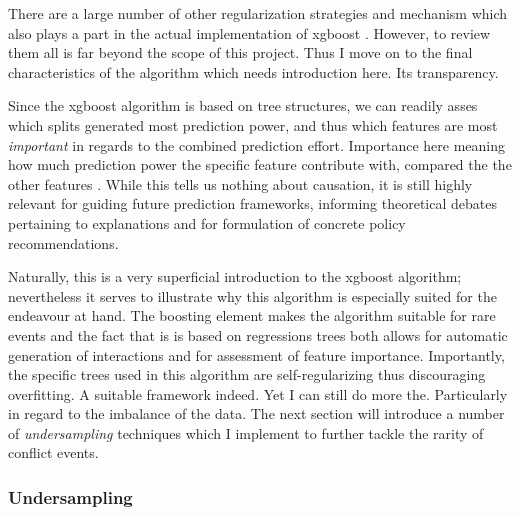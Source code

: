 \documentclass[a4paper]{article}
\begin{document}
There are a large number of other regularization strategies and mechanism which also plays a part in the actual implementation of xgboost \citep[787]{Chen_2016}. However, to review them all is far beyond the scope of this project. Thus I move on to the final characteristics of the algorithm which needs introduction here. Its transparency.\par

Since the xgboost algorithm is based on tree structures, we can readily asses which splits generated most prediction power, and thus which features are most \emph{important} in regards to the combined prediction effort. Importance here meaning how much prediction power the specific feature contribute with, compared the the other features \citep[787-788]{Chen_2016}. While this tells us nothing about causation, it is still highly relevant for guiding future prediction frameworks, informing theoretical debates pertaining to explanations and for formulation of concrete policy recommendations.\par

Naturally, this is a very superficial introduction to the xgboost algorithm; nevertheless it serves to illustrate why this algorithm is especially suited for the endeavour at hand. The boosting element makes the algorithm suitable for rare events and the fact that is is based on regressions trees both allows for automatic generation of interactions and for assessment of feature importance. Importantly, the specific trees used in this algorithm are self-regularizing thus discouraging overfitting. A suitable framework indeed. Yet I can still do more the. Particularly in regard to the imbalance of the data. The next section will introduce a number of \emph{undersampling} techniques which I implement to further tackle the rarity of conflict events.\par 

\subsubsection{Undersampling}

\end{document}
